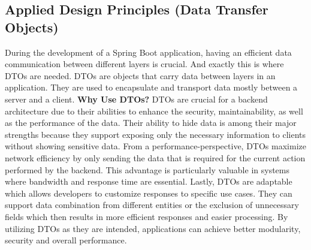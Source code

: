     \subsection{Applied Design Principles (Data Transfer Objects)}
    During the development of a Spring Boot application, having an efficient data communication between different layers is crucial. And exactly this is where DTOs are needed. \newline
    DTOs are objects that carry data between layers in an application. They are used to encapsulate and transport data mostly between a server and a client.
    \newline \newline
    \textbf{Why Use DTOs?} \newline
    DTOs are crucial for a backend architecture due to their abilities to enhance the security, maintainability, as well as the performance of the data. Their ability to hide data is among their major strengths because they support exposing only the necessary information to clients without showing sensitive data. \newline
    From a performance-perspective, DTOs maximize network efficiency by only sending the data that is required for the current action performed by the backend. This advantage is particularly valuable in systems where bandwidth and response time are essential. \newline
    Lastly, DTOs are adaptable which allows developers to customize responses to specific use cases. They can support data combination from different entities or the exclusion of unnecessary fields which then results in more efficient responses and easier processing. \newline
    By utilizing DTOs as they are intended, applications can achieve better modularity, security and overall performance. 

    \newpage


